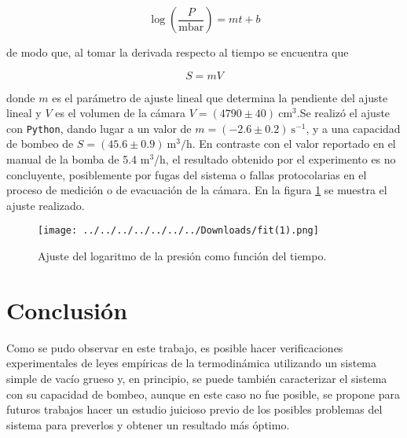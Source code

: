 \documentclass[final,5p,times,twocolumn, nopreprintline]{elsarticle}
\numberwithin{equation}{section}
\begin{document}
\begin{equation}
\log \left(\dfrac{P}{\text{mbar}}\right) = mt+b \label{eq3}
\end{equation}

de modo que, al tomar la derivada respecto al tiempo se encuentra que 

\begin{equation}
S = mV \label{eq4}
\end{equation}

donde $m$ es el parámetro de ajuste lineal que determina la pendiente del ajuste lineal y $V$ es el volumen de la cámara $V=(4790\pm40)~\text{cm}^3$.Se realizó el ajuste con \texttt{Python}, dando lugar a un valor de $m=(-2.6\pm0.2)~\text{s}^{-1}$, y a una capacidad de bombeo de $S=(45.6\pm0.9)~\text{m}^3/\text{h}$. En contraste con el valor reportado en el manual de la bomba \cite{pfeiffer2005sd} de 5.4 m$^3$/h, el resultado obtenido por el experimento es no concluyente, posiblemente por fugas del sistema o fallas protocolarias en el proceso de medición o de evacuación de la cámara. En la figura \ref{fig6} se muestra el ajuste realizado.

\begin{figure}[h!]
\begin{center}
\texttt{[image: ../../../../../../../Downloads/fit(1).png]} 
\caption{Ajuste del logaritmo de la presión como función del tiempo.} \label{fig6}
\end{center}
\end{figure}

\section{Conclusión}

Como se pudo observar en este trabajo, es posible hacer verificaciones experimentales de leyes empíricas de la termodinámica utilizando un sistema simple de vacío grueso y, en principio, se puede también caracterizar el sistema con su capacidad de bombeo, aunque en este caso no fue posible, se propone para futuros trabajos hacer un estudio juicioso previo de los posibles problemas del sistema para preverlos y obtener un resultado más óptimo.

 

%
%






\end{document}

